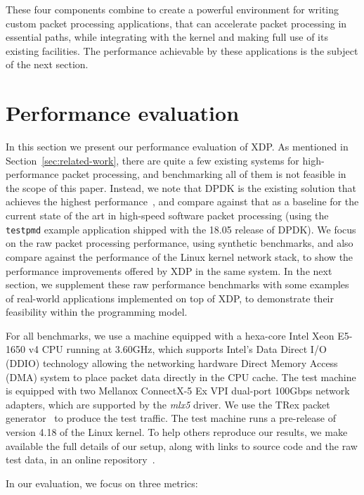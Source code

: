 \documentclass[sigconf]{acmart}
\begin{document}
These four components combine to create a powerful environment for writing
custom packet processing applications, that can accelerate packet processing in
essential paths, while integrating with the kernel and making full use of its
existing facilities. The performance achievable by these applications is the
subject of the next section.

\section{Performance evaluation}
\label{sec:perf-eval}
In this section we present our performance evaluation of XDP. As mentioned in
Section~\ref{sec:related-work}, there are quite a few existing systems for
high-performance packet processing, and benchmarking all of them is not feasible
in the scope of this paper. Instead, we note that DPDK is the existing solution
that achieves the highest performance~\cite{gallenmuller_comparison_2015}, and
compare against that as a baseline for the current state of the art in
high-speed software packet processing (using the \texttt{testpmd} example
application shipped with the 18.05 release of DPDK). We focus on the raw packet
processing performance, using synthetic benchmarks, and also compare against the
performance of the Linux kernel network stack, to show the performance
improvements offered by XDP in the same system. In the next section, we
supplement these raw performance benchmarks with some examples of real-world
applications implemented on top of XDP, to demonstrate their feasibility within
the programming model.

For all benchmarks, we use a machine equipped with a hexa-core Intel Xeon
E5-1650 v4 CPU running at 3.60GHz, which supports Intel's Data Direct I/O (DDIO)
technology allowing the networking hardware Direct Memory Access (DMA) system to
place packet data directly in the CPU cache. The test machine is equipped with
two Mellanox ConnectX-5 Ex VPI dual-port 100Gbps network adapters, which are
supported by the \emph{mlx5} driver. We use the TRex packet
generator~\cite{cisco18:_trex_traff_gener} to produce the test traffic. The test
machine runs a pre-release of version 4.18 of the Linux kernel. To help others
reproduce our results, we make available the full details of our setup, along
with links to source code and the raw test data, in an online
repository~\cite{test-data}.

In our evaluation, we focus on three metrics:
\end{document}
